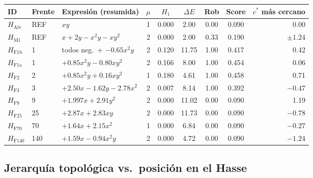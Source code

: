 \documentclass[11pt,a4paper]{article}
\newcommand{\dE}{\Delta E}
\begin{document}
\begin{adjustbox}{max width=\textwidth}
\begin{tabular}{lllcccccr}
  \toprule
  \textbf{ID} & \textbf{Frente} & \textbf{Expresión (resumida)} &
  \textbf{$\mu$} & \textbf{$H_1$} & \textbf{$\dE$} &
  \textbf{Rob} & \textbf{Score} & \textbf{$c^*$ más cercano} \\
  \midrule
  $H_{\text{Alv}}$   & REF   & $xy$                     & 1 & 0.000 & 2.00 & 0.00 & 0.090 & 0.00 \\
  $H_{\text{M1}}$    & REF   & $x+2y-x^2y-xy^2$         & 2 & 0.000 & 2.00 & 0.33 & 0.190 & $\pm 1.24$ \\
  $H_{\text{F1b}}$   & 1     & {\small todos neg.\ + $-0.65x^2y$} & 2 & 0.120 & 11.75 & 1.00 & 0.417 & 0.42 \\
  $H_{\text{F1a}}$   & 1     & {\small $+0.85x^2y-0.80xy^2$}      & 2 & 0.166 & 8.00 & 1.00 & 0.454 & 0.06 \\
  $H_{\text{F2}}$    & 2     & {\small $+0.85x^2y+0.16xy^2$}      & 1 & 0.180 & 4.61 & 1.00 & 0.458 & 0.71 \\
  $H_{\text{F3}}$    & 3     & {\small $+2.50x-1.62y-2.78x^2$}    & 2 & 0.007 & 8.14 & 1.00 & 0.392 & $-0.47$ \\
  $H_{\text{F9}}$    & 9     & {\small $+1.997x+2.91y^2$}         & 2 & 0.000 & 11.02 & 0.00 & 0.090 & 1.19 \\
  $H_{\text{F25}}$   & 25    & {\small $+2.87x+2.83xy$}           & 2 & 0.000 & 11.73 & 0.00 & 0.090 & $-0.78$ \\
  $H_{\text{F70}}$   & 70    & {\small $+1.64x+2.15x^2$}          & 1 & 0.000 & 6.84 & 0.00 & 0.090 & $-0.27$ \\
  $H_{\text{F140}}$  & 140   & {\small $+1.59x-0.94x^2y$}         & 2 & 0.000 & 4.72 & 0.00 & 0.090 & $-1.24$ \\
  \bottomrule
\end{tabular}
\end{adjustbox}

\subsection{Jerarquía topológica vs.\ posición en el Hasse}
\end{document}
